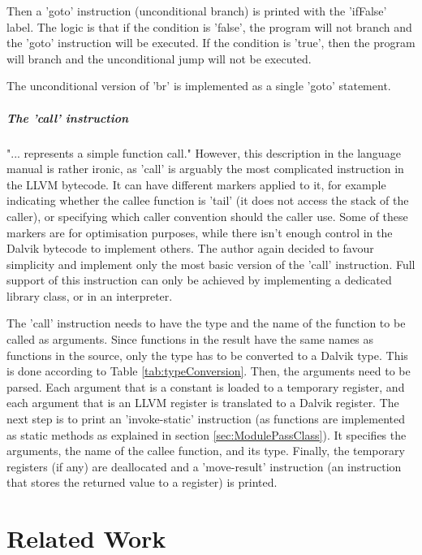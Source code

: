 \documentclass[parskip]{cs4rep}
\begin{document}
Then a 'goto' instruction (unconditional branch) is printed with the 'ifFalse' label. The logic is that if the condition is 'false', the program will not branch and the 'goto' instruction will be executed. If the condition is 'true', then the program will branch and the unconditional jump will not be executed.

The unconditional version of 'br' is implemented as a single 'goto' statement.

\paragraph{The 'call' instruction} "... represents a simple function call."\cite{P11} However, this description in the language manual is rather ironic, as 'call' is arguably the most complicated instruction in the LLVM bytecode. It can have different markers applied to it, for example indicating whether the callee function is 'tail' (it does not access the stack of the caller), or specifying which caller convention should the caller use. Some of these markers are for optimisation purposes, while there isn't enough control in the Dalvik bytecode to implement others. The author again decided to favour simplicity and implement only the most basic version of the 'call' instruction. Full support of this instruction can only be achieved by implementing a dedicated library class, or in an interpreter.

The 'call' instruction needs to have the type and the name of the function to be called as arguments. Since functions in the result have the same names as functions in the source, only the type has to be converted to a Dalvik type. This is done according to Table \ref{tab:typeConversion}. Then, the arguments need to be parsed. Each argument that is a constant is loaded to a temporary register, and each argument that is an LLVM register is translated to a Dalvik register. The next step is to print an 'invoke-static' instruction (as functions are implemented as static methods as explained in section \ref{sec:ModulePassClass}). It specifies the arguments, the name of the callee function, and its type. Finally, the temporary registers (if any) are deallocated and a 'move-result' instruction (an instruction that stores the returned value to a register) is printed.

\chapter{Related Work}
\end{document}
